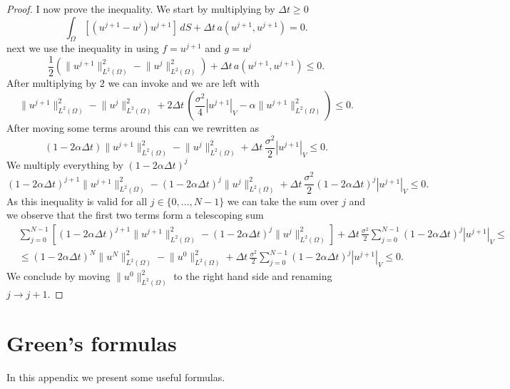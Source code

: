 \documentclass{article}
\newcommand{\argwrapsquare}[1]{\left[#1\right]}
\newcommand{\intS}[1]{\ensuremath{\int_{\Omega}#1 \, dS}}
\newcommand{\intSlong}[1]{\intS{\argwrapsquare{#1}}}
\newcommand{\sigmafrac}{\ensuremath{\frac{\sigma^2}{2}}}
\newcommand{\seminorm}[1]{\ensuremath{|#1|_V}}
\newcommand{\normsq}[1]{\ensuremath{\|#1\|_{L^2(\Omega)}^2}}
\begin{document}
\begin{proof}
   I now prove the inequality. We start by multiplying  by $\Delta t \geq 0$
   \begin{equation*}
    \intSlong{(u^{j+1} - u^j)  u^{j+1}} + \Delta t \,a(u^{j+1},u^{j+1}) = 0.
    \end{equation*}
    next we use the inequality in  using $f = u^{j+1}$ and $g =u^j$
    \begin{equation*}
        \frac{1}{2}\left( \normsq{u^{j+1}} - \normsq{u^{j}} \right) + \Delta t \,a(u^{j+1},u^{j+1}) \leq 0.
    \end{equation*}
    After multiplying by $2$ we can invoke  and we are left with
    \begin{equation*}
         \normsq{u^{j+1}} - \normsq{u^{j}} + 2\Delta t \, \left( \frac{\sigma^2}{4} \seminorm{u^{j+1}} - \alpha \normsq{u^{j+1}} \right) \leq 0.
    \end{equation*}
    After moving some terms around this can we rewritten as
    \begin{equation*}
        (1- 2\alpha \Delta t)\normsq{u^{j+1}}  - \normsq{u^{j}} + \Delta t \, \sigmafrac \seminorm{u^{j+1}} \leq 0.
    \end{equation*}
   We multiply everything by $(1- 2\alpha \Delta t)^j$
   \begin{equation*}
       (1- 2\alpha \Delta t)^{j+1}\normsq{u^{j+1}}  - (1- 2\alpha \Delta t)^j \normsq{u^{j}} + \Delta t \, \sigmafrac (1- 2\alpha \Delta t)^j\seminorm{u^{j+1}} \leq 0.
   \end{equation*}
   As this inequality is valid for all $j \in \{0, \ldots, N-1 \}$ we can take the sum over $j$ and we observe that the first two terms form a telescoping sum
   \begin{align*}
       &\sum_{j=0}^{N-1} \left[(1- 2\alpha \Delta t)^{j+1}\normsq{u^{j+1}}  - (1- 2\alpha \Delta t)^j \normsq{u^{j}}\right] + \Delta t \, \sigmafrac \sum_{j=0}^{N-1}(1- 2\alpha \Delta t)^j\seminorm{u^{j+1}} \leq \\
       &\leq (1- 2\alpha \Delta t)^{N}\normsq{u^{N}} - \normsq{u^{0}} + \Delta t \, \sigmafrac \sum_{j=0}^{N-1}(1- 2\alpha \Delta t)^j\seminorm{u^{j+1}} \leq 0.
   \end{align*}
   We conclude by moving $\normsq{u^{0}}$ to the right hand side and renaming $j \rightarrow j+1$.
\end{proof}




\appendix
\section{Green's formulas}
In this appendix we present some useful formulas.
\end{document}
